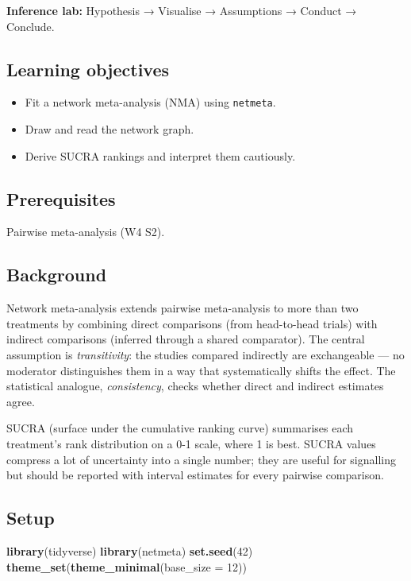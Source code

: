 \documentclass[
]{article}
\author{}
\date{\vspace{-2.5em}}
\newenvironment{Shaded}{\begin{snugshade}}{\end{snugshade}}
\newcommand{\AttributeTok}[1]{\textcolor[rgb]{0.13,0.29,0.53}{#1}}
\newcommand{\DecValTok}[1]{\textcolor[rgb]{0.00,0.00,0.81}{#1}}
\newcommand{\FunctionTok}[1]{\textcolor[rgb]{0.13,0.29,0.53}{\textbf{#1}}}
\newcommand{\NormalTok}[1]{#1}
\providecommand{\tightlist}{%
  \setlength{\itemsep}{0pt}\setlength{\parskip}{0pt}}
\begin{document}
\textbf{Inference lab:} Hypothesis → Visualise → Assumptions → Conduct →
Conclude.

\subsection{Learning objectives}\label{learning-objectives}

\begin{itemize}
\tightlist
\item
  Fit a network meta-analysis (NMA) using \texttt{netmeta}.
\item
  Draw and read the network graph.
\item
  Derive SUCRA rankings and interpret them cautiously.
\end{itemize}

\subsection{Prerequisites}\label{prerequisites}

Pairwise meta-analysis (W4 S2).

\subsection{Background}\label{background}

Network meta-analysis extends pairwise meta-analysis to more than two
treatments by combining direct comparisons (from head-to-head trials)
with indirect comparisons (inferred through a shared comparator). The
central assumption is \emph{transitivity}: the studies compared
indirectly are exchangeable --- no moderator distinguishes them in a way
that systematically shifts the effect. The statistical analogue,
\emph{consistency}, checks whether direct and indirect estimates agree.

SUCRA (surface under the cumulative ranking curve) summarises each
treatment's rank distribution on a 0-1 scale, where 1 is best. SUCRA
values compress a lot of uncertainty into a single number; they are
useful for signalling but should be reported with interval estimates for
every pairwise comparison.

\subsection{Setup}\label{setup}

\begin{Shaded}
\begin{Highlighting}[]
\FunctionTok{library}\NormalTok{(tidyverse)}
\FunctionTok{library}\NormalTok{(netmeta)}
\FunctionTok{set.seed}\NormalTok{(}\DecValTok{42}\NormalTok{)}
\FunctionTok{theme\_set}\NormalTok{(}\FunctionTok{theme\_minimal}\NormalTok{(}\AttributeTok{base\_size =} \DecValTok{12}\NormalTok{))}
\end{Highlighting}
\end{Shaded}
\end{document}
